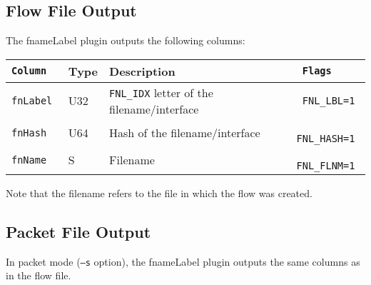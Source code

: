 \documentclass[documentation]{subfiles}
\begin{document}
\subsection{Flow File Output}
The fnameLabel plugin outputs the following columns:
\begin{longtable}{>{\tt}lll>{\tt\small}l}
    \toprule
    {\bf Column} & {\bf Type} & {\bf Description} & {\bf Flags}\\
    \midrule\endhead%
    fnLabel & U32 & {\tt FNL\_IDX} letter of the filename/interface & FNL\_LBL=1\\
    fnHash  & U64 & Hash of the filename/interface                  & FNL\_HASH=1\\
    fnName  & S   & Filename                                        & FNL\_FLNM=1\\
    \bottomrule
\end{longtable}
Note that the filename refers to the file in which the flow was created.

\subsection{Packet File Output}
In packet mode ({\tt --s} option), the fnameLabel plugin outputs the same columns as in the flow file.
\end{document}
